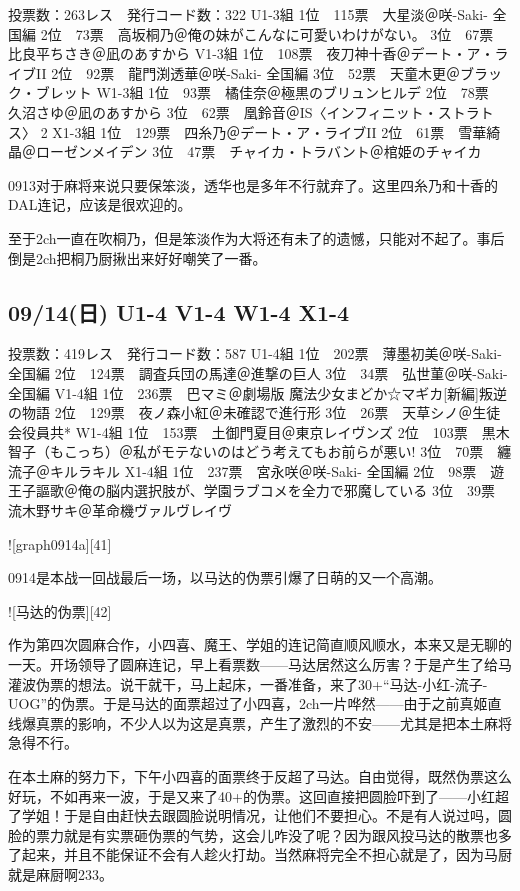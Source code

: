 	投票数：263レス　発行コード数：322
	U1-3組
	1位　115票　大星淡＠咲-Saki- 全国編
	2位　73票　高坂桐乃＠俺の妹がこんなに可愛いわけがない。
	3位　67票　比良平ちさき＠凪のあすから
	V1-3組
	1位　108票　夜刀神十香＠デート・ア・ライブII
	2位　92票　龍門渕透華＠咲-Saki- 全国編
	3位　52票　天童木更＠ブラック・ブレット
	W1-3組
	1位　93票　橘佳奈＠極黒のブリュンヒルデ
	2位　78票　久沼さゆ＠凪のあすから
	3位　62票　凰鈴音＠IS〈インフィニット・ストラトス〉 2
	X1-3組
	1位　129票　四糸乃＠デート・ア・ライブII
	2位　61票　雪華綺晶＠ローゼンメイデン
	3位　47票　チャイカ・トラバント＠棺姫のチャイカ

0913对于麻将来说只要保笨淡，透华也是多年不行就弃了。这里四糸乃和十香的DAL连记，应该是很欢迎的。

至于2ch一直在吹桐乃，但是笨淡作为大将还有未了的遗憾，只能对不起了。事后倒是2ch把桐乃厨揪出来好好嘲笑了一番。

\subsection{09/14(日) U1-4 V1-4 W1-4 X1-4}

	投票数：419レス　発行コード数：587
	U1-4組
	1位　202票　薄墨初美＠咲-Saki- 全国編
	2位　124票　調査兵団の馬達＠進撃の巨人
	3位　34票　弘世菫＠咲-Saki- 全国編
	V1-4組
	1位　236票　巴マミ＠劇場版 魔法少女まどか☆マギカ[新編]叛逆の物語
	2位　129票　夜ノ森小紅＠未確認で進行形
	3位　26票　天草シノ＠生徒会役員共*
	W1-4組
	1位　153票　土御門夏目＠東京レイヴンズ
	2位　103票　黒木智子（もこっち）＠私がモテないのはどう考えてもお前らが悪い!
	3位　70票　纏流子＠キルラキル
	X1-4組
	1位　237票　宮永咲＠咲-Saki- 全国編
	2位　98票　遊王子謳歌＠俺の脳内選択肢が、学園ラブコメを全力で邪魔している
	3位　39票　流木野サキ＠革命機ヴァルヴレイヴ

![graph0914a][41]

0914是本战一回战最后一场，以马达的伪票引爆了日萌的又一个高潮。

![马达的伪票][42]

作为第四次圆麻合作，小四喜、魔王、学姐的连记简直顺风顺水，本来又是无聊的一天。开场领导了圆麻连记，早上看票数——马达居然这么厉害？于是产生了给马灌波伪票的想法。说干就干，马上起床，一番准备，来了30+“马达-小红-流子-UOG”的伪票。于是马达的面票超过了小四喜，2ch一片哗然——由于之前真姬直线爆真票的影响，不少人以为这是真票，产生了激烈的不安——尤其是把本土麻将急得不行。

在本土麻的努力下，下午小四喜的面票终于反超了马达。自由觉得，既然伪票这么好玩，不如再来一波，于是又来了40+的伪票。这回直接把圆脸吓到了——小红超了学姐！于是自由赶快去跟圆脸说明情况，让他们不要担心。不是有人说过吗，圆脸的票力就是有实票砸伪票的气势，这会儿咋没了呢？因为跟风投马达的散票也多了起来，并且不能保证不会有人趁火打劫。当然麻将完全不担心就是了，因为马厨就是麻厨啊233。

